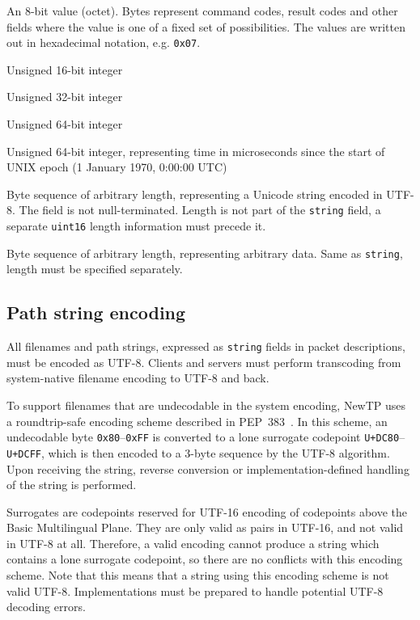 \def\ttitem#1{ \item[\ttfamily #1] }
\begin{description}[leftmargin=1.7cm,style=sameline]
	\ttitem{byte} An 8-bit value (octet). Bytes represent command codes, result codes and other fields
		where the value is one of a fixed set of possibilities. The values are written out in
		hexadecimal notation, e.g. {\tt 0x07}.
	\ttitem{uint16} Unsigned 16-bit integer
	\ttitem{uint32} Unsigned 32-bit integer
	\ttitem{uint64} Unsigned 64-bit integer
	\ttitem{time\_t} Unsigned 64-bit integer, representing time in microseconds since the start of UNIX
		epoch (1 January 1970, 0:00:00 UTC)
	\ttitem{string} Byte sequence of arbitrary length, representing a Unicode string encoded in UTF-8.
		The field is not null-terminated. Length is not part of the {\tt string} field, a separate
		{\tt uint16} length information must precede it.
	\ttitem{data} Byte sequence of arbitrary length, representing arbitrary data. Same as {\tt string},
		length must be specified separately.
\end{description}

%

\subsection{Path string encoding}

All filenames and path strings, expressed as {\tt string} fields in packet descriptions, must be encoded as
UTF-8. Clients and servers must perform transcoding from system-native filename encoding to UTF-8 and back.

To support filenames that are undecodable in the system encoding, NewTP uses a roundtrip-safe encoding scheme
described in PEP~383~\cite{pep383}. In this scheme, an undecodable byte {\tt 0x80}--{\tt 0xFF} is converted to
a lone surrogate codepoint {\tt U+DC80}--{\tt U+DCFF}, which is then encoded to a 3-byte sequence by the UTF-8
algorithm. Upon receiving the string, reverse conversion or implementation-defined handling of the string is
performed.

Surrogates are codepoints reserved for UTF-16 encoding of codepoints above the Basic Multilingual Plane. They
are only valid as pairs in UTF-16, and not valid in UTF-8 at all. Therefore, a valid encoding cannot produce
a string which contains a lone surrogate codepoint, so there are no conflicts with this encoding scheme. Note
that this means that a string using this encoding scheme is not valid UTF-8. Implementations must be prepared
to handle potential UTF-8 decoding errors.

